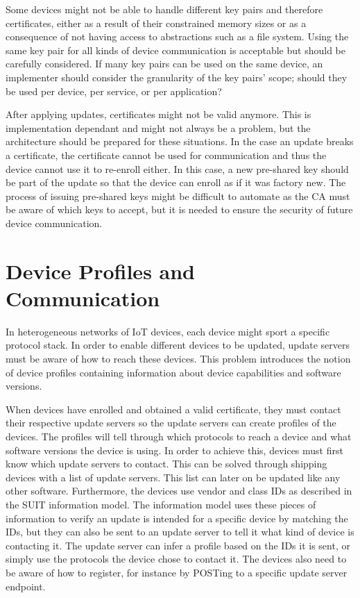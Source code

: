 \documentclass[0-thesis.tex]{subfiles}
\begin{document}
Some devices might not be able to handle different key pairs and therefore certificates,
either as a result of their constrained memory sizes or as a consequence of not having
access to abstractions such as a file system. Using the same key pair for all kinds of
device communication is acceptable but should be carefully considered. If many key pairs
can be used on the same device, an implementer should consider the granularity of the key
pairs' scope; should they be used per device, per service, or per application?

After applying updates, certificates might not be valid anymore. This is implementation
dependant and might not always be a problem, but the architecture should be prepared for
these situations. In the case an update breaks a certificate, the certificate cannot be
used for communication and thus the device cannot use it to re-enroll either. In this
case, a new pre-shared key should be part of the update so that the device can enroll as
if it was factory new. The process of issuing pre-shared keys might be difficult to
automate as the CA must be aware of which keys to accept, but it is needed to ensure the
security of future device communication.

\section{Device Profiles and Communication}
\label{sec:communication}
In heterogeneous networks of IoT devices, each device might sport a specific protocol
stack. In order to enable different devices to be updated, update servers must be aware of
how to reach these devices. This problem introduces the notion of device profiles
containing information about device capabilities and software versions. 

When devices have enrolled and obtained a valid certificate, they must contact their
respective update servers so the update servers can create profiles of the devices. The
profiles will tell through which protocols to reach a device and what software versions
the device is using. In order to achieve this, devices must first know which update
servers to contact. This can be solved through shipping devices with a list of update
servers. This list can later on be updated like any other software. Furthermore, the
devices use vendor and class IDs as described in the SUIT information model. The
information model uses these pieces of information to verify an update is intended for a
specific device by matching the IDs, but they can also be sent to an update server to tell
it what kind of device is contacting it. The update server can infer a profile based on
the IDs it is sent, or simply use the protocols the device chose to contact it. The
devices also need to be aware of how to register, for instance by POSTing to a specific
update server endpoint. 
\end{document}
